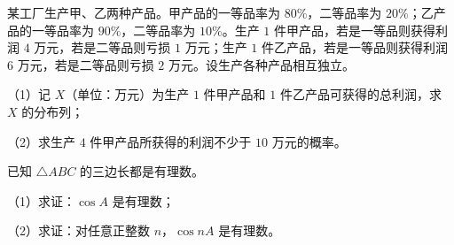 \endgroup
\begin{question}
某工厂生产甲、乙两种产品。甲产品的一等品率为 $80\%$，二等品率为 $20\%$；乙产品的一等品率为 $90\%$，二等品率为 $10\%$。生产 $1$ 件甲产品，若是一等品则获得利润 $4$ 万元，若是二等品则亏损 $1$ 万元；生产 $1$ 件乙产品，若是一等品则获得利润 $6$ 万元，若是二等品则亏损 $2$ 万元。设生产各种产品相互独立。

（1）记 $X$（单位：万元）为生产 $1$ 件甲产品和 $1$ 件乙产品可获得的总利润，求 $X$ 的分布列；

（2）求生产 $4$ 件甲产品所获得的利润不少于 $10$ 万元的概率。

\end{question}
\begin{question}
已知 $\triangle ABC$ 的三边长都是有理数。

（1）求证：$\cos A$ 是有理数；

（2）求证：对任意正整数 $n$，$\cos nA$ 是有理数。

\end{question}